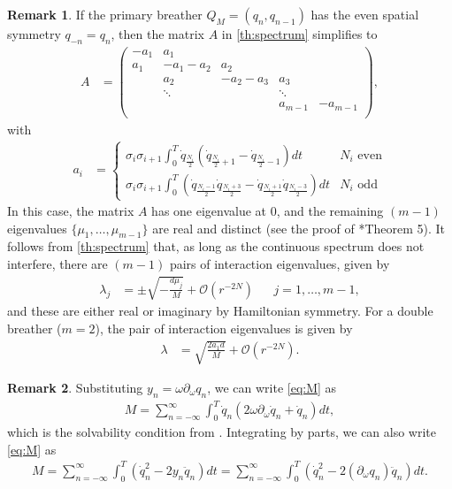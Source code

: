 \documentclass[12pt,reqno]{amsart}
\theoremstyle{definition}
\newtheorem{remark}{Remark}
\begin{document}
\begin{remark}If the primary breather $Q_M = (q_n, q_{n-1})$ has the even spatial symmetry $q_{-n} = q_n$, then the matrix $A$ in \cref{th:spectrum} simplifies to
\begin{align}\label{matrixAsymm}
A &= \begin{pmatrix}
-a_1 & a_1 & & & \\
a_1 & -a_1 - a_2 & a_2 \\
& a_2 & -a_2 - a_3 & a_3 \\
& \ddots & & \ddots \\
& & & a_{m-1} & -a_{m-1}  \\
\end{pmatrix},
\end{align}
with
\begin{align*}
a_i &= \begin{cases}
\sigma_i \sigma_{i+1} \int_0^T \dot{q}_{\frac{N_i}{2}}\left( \dot{q}_{\frac{N_i}{2}+1} - \dot{q}_{\frac{N_i}{2}-1}\right) dt & N_i \text{ even} \\
\sigma_i \sigma_{i+1} \int_0^T \left( \dot{q}_{\frac{N_i-1}{2}}\dot{q}_{\frac{N_i+3}{2}} - \dot{q}_{\frac{N_i+1}{2}}\dot{q}_{\frac{N_i-3}{2}} \right) dt & N_i \text{ odd}
\end{cases}
\end{align*}
In this case, the matrix $A$ has one eigenvalue at 0, and the remaining $(m-1)$ eigenvalues $\{\mu_1, \dots, \mu_{m-1}\}$ are real and distinct (see the proof of \cite{Parker2020}*{Theorem 5}). It follows from \cref{th:spectrum} that, as long as the continuous spectrum does not interfere, there are $(m-1)$ pairs of interaction eigenvalues, given by 
\begin{align}\label{eq:inteigs}
\lambda_j &= \pm \sqrt{-\frac{d \mu_j}{M}} + \mathcal{O}(r^{-2N}) && j = 1, \dots, m-1,
\end{align}
and these are either real or imaginary by Hamiltonian symmetry. For a double breather ($m = 2$), the pair of interaction eigenvalues is given by
\begin{align}\label{eq:inteigsdouble}
\lambda &= \sqrt{\frac{2 a_1 d}{M}} + \mathcal{O}(r^{-2N}).
\end{align}
\end{remark}

\begin{remark}
Substituting $y_n = \omega \partial_\omega q_n$, we can write \cref{eq:M} as 
\begin{align}\label{eq:M2}
M =
\sum_{n = -\infty}^\infty \int_0^T \dot{q}_n \left( 2 \omega \partial_\omega \dot{q}_n + \dot{q}_n \right) dt,
\end{align}
which is the solvability condition from \cite{kevrekidis2016}. Integrating by parts, we can also write \cref{eq:M} as 
\begin{align}\label{eq:M3}
M =
\sum_{n = -\infty}^\infty \int_0^T \left( \dot{q}_n^2 - 2 y_n \ddot{q}_n \right) dt =
\sum_{n = -\infty}^\infty \int_0^T \left( \dot{q}_n^2 - 2 (\partial_\omega q_n) \ddot{q}_n \right) dt.
\end{align}
\end{remark}
\end{document}
